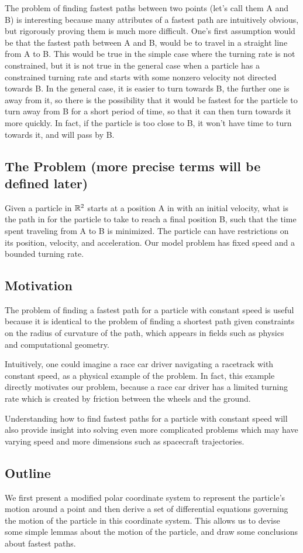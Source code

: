 The problem of finding fastest paths between two points (let's call them A and B) is interesting because many attributes of a fastest path are intuitively obvious, but rigorously proving them is much more difficult. One's first assumption would be that the fastest path between A and B, would be to travel in a straight line from A to B. This would be true in the simple case where the turning rate is not constrained, but it is not true in the general case when a particle has a constrained turning rate and starts with some nonzero velocity not directed towards B. In the general case, it is easier to turn towards B, the further one is away from it, so there is the possibility that it would be fastest for the particle to turn away from B for a short period of time, so that it can then turn towards it more quickly. In fact, if the particle is too close to B, it won't have time to turn towards it, and will pass by B. 

\subsection{The Problem (more precise terms will be defined later)}

Given a particle in $\mathbb R^2$ starts at a position A in with an initial velocity, what is the path in for the particle to take to reach a final position B, such that the time spent traveling from A to B is minimized. The particle can have restrictions on its position, velocity, and acceleration. Our model problem has fixed speed and a bounded turning rate.

\subsection{Motivation}

The problem of finding a fastest path for a particle with constant speed is useful because it is identical to the problem of finding a shortest path given constraints on the radius of curvature of the path, which appears in fields such as physics and computational geometry. 

Intuitively, one could imagine a race car driver navigating a racetrack with constant speed, as a physical example of the problem. In fact, this example directly motivates our problem, because a race car driver has a limited turning rate which is created by friction between the wheels and the ground.

Understanding how to find fastest paths for a particle with constant speed will also provide insight into solving even more complicated problems which may have varying speed and more dimensions such as spacecraft trajectories.

\subsection{Outline}

We first present a modified polar coordinate system to represent the particle's motion around a point and then derive a set of differential equations governing the motion of the particle in this coordinate system. This allows us to devise some simple lemmas about the motion of the particle, and draw some conclusions about fastest paths.